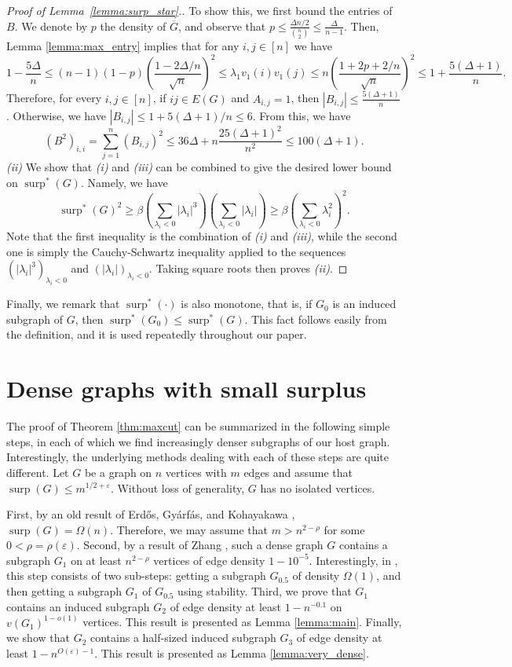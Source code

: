 \documentclass[11pt]{article}
\theoremstyle{plain}
\theoremstyle{definition}
\DeclareMathOperator{\surp}{surp}
\newcommand{\eps}{\varepsilon}
\begin{document}
\begin{proof}[Proof of Lemma~\ref{lemma:surp_star}.]
To show this, we first bound the entries of $B$. We denote by $p$ the density of $\overline{G}$, and observe that $p\leq \frac{\Delta n/2}{\binom{n}{2}}\leq \frac{\Delta}{n-1}$. Then, Lemma \ref{lemma:max_entry} implies that for any $i, j\in [n]$ we have 
\[ 1-\frac{5\Delta}{n}\leq (n-1)(1-p)\left(\frac{1-2\Delta/n}{\sqrt{n}}\right)^2\leq \lambda_1 v_1(i)v_1(j)\leq n\left(\frac{1+2p+2/n}{\sqrt{n}}\right)^2\leq 1+\frac{5(\Delta+1)}{n}.\]
Therefore, for every $i, j\in [n]$, if $ij\in E(G)$ and $A_{i, j}=1$, then $|B_{i, j}|\leq \frac{5(\Delta+1)}{n}$. Otherwise, we have $|B_{i,j}|\leq 1+5(\Delta+1)/n\leq 6$. From this, we have 
$$(B^2)_{i,i}=\sum_{j=1}^n (B_{i,j})^2\leq 36\Delta+n\frac{25(\Delta+1)^2}{n^2}\leq 100(\Delta+1).$$
\textit{(ii)} We show that \textit{(i)} and \textit{(iii)} can be combined to give the desired lower bound on $\surp^*(G)$. Namely, we have
\[\surp^*(G)^2\geq \beta\left(\sum_{\lambda_i<0}|\lambda_i|^3\right)\left(\sum_{\lambda_i<0}|\lambda_i|\right)\geq \beta\left(\sum_{\lambda_i<0}\lambda_i^2\right)^2.\]
Note that the first inequality is the combination of \textit{(i)} and \textit{(iii)}, while the second one is simply the Cauchy-Schwartz inequality applied to the sequences $(|\lambda_i|^3)_{\lambda_i<0}$ and $(|\lambda_i|)_{\lambda_i<0}$. Taking square roots then proves \textit{(ii)}.
\end{proof}

Finally, we remark that $\surp^*(\cdot)$ is also monotone, that is, if $G_0$ is an induced subgraph of $G$, then $\surp^*(G_0)\leq \surp^*(G)$. This fact follows easily from the definition, and it is used repeatedly throughout our paper.

\section{Dense graphs with small surplus}\label{sect:1}

The proof of Theorem \ref{thm:maxcut} can be summarized in the following simple steps, in each of which we find increasingly denser subgraphs of our host graph. Interestingly, the underlying methods dealing with each of these steps are quite different. Let $G$ be a graph on $n$ vertices with $m$ edges and assume that $\surp(G)\leq m^{1/2+\eps}$. Without loss of generality, $G$ has no isolated vertices.

First, by an old result of Erd\H{o}s, Gy\'arf\'as, and Kohayakawa \cite{EGyK}, $\surp(G)=\Omega(n)$. Therefore, we may assume that $m>n^{2-\rho}$ for some $0<\rho=\rho(\eps)$. Second, by a result of Zhang \cite{Zhang}, such a dense graph $G$ contains a subgraph $G_1$ on at least $n^{2-\rho}$ vertices of edge density $1-10^{-5}$. Interestingly, in \cite{Zhang}, this step consists of two sub-steps: getting a subgraph $G_{0.5}$ of density $\Omega(1)$, and then getting a subgraph $G_1$ of $G_{0.5}$ using stability. Third, we prove that $G_1$ contains an induced subgraph $G_2$ of edge density at least $1-n^{-0.1}$ on $v(G_1)^{1-o(1)}$ vertices. This result is presented as Lemma \ref{lemma:main}. Finally, we show that $G_2$ contains a half-sized induced subgraph $G_3$ of edge density at least $1-n^{O(\eps)-1}$. This result is presented as Lemma \ref{lemma:very_dense}.
\end{document}
